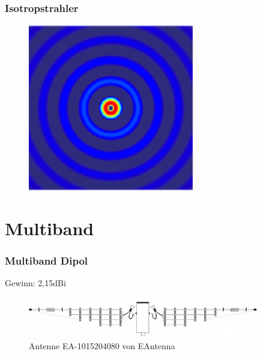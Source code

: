 \begin{frame}
  \frametitle{Isotropstrahler}
  \begin{center}
    \begin{figure}
      \includegraphics[width=0.65\textwidth,height=.75\textheight,keepaspectratio]{e11/Spherical_wave2.png}
    \end{figure}
  \end{center}
\end{frame}

\section*{Multiband}

\begin{frame}
  \frametitle{Multiband Dipol}
  Gewinn: 2,15dBi
  \begin{center}
    \begin{figure}
      \includegraphics[width=0.9\textwidth,height=.75\textheight,keepaspectratio]{e11/Multiband.jpg}
      \caption{Antenne EA-1015204080 von EAntenna}
    \end{figure}
  \end{center}
\end{frame}

